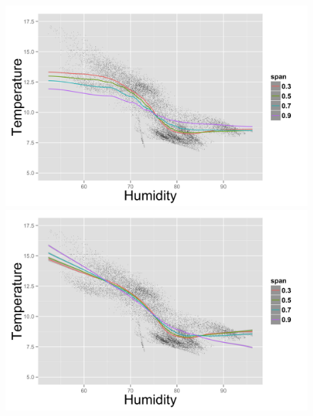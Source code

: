 \begin{figure}
\begin{minipage}[t]{0.34\textwidth}
    \subcaption{}
  \end{minipage}\\
  \begin{minipage}[t]{0.33\textwidth}
    \centering
    \includegraphics[width=\textwidth,height=\textwidth]{fig/Humid_Temp_Loess_poly0.png}
  \end{minipage}
  \begin{minipage}[t]{0.33\textwidth}
    \centering
    \includegraphics[width=\textwidth,height=\textwidth]{fig/Humid_Temp_Loess_poly1.png}

\end{minipage}
\end{figure}

